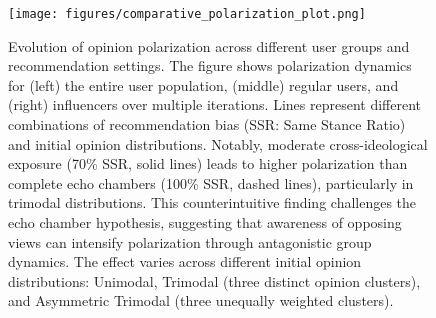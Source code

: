 \begin{figure}[htbp]
    \centering
    \texttt{[image: figures/comparative\_polarization\_plot.png]}
    \caption{Evolution of opinion polarization across different user groups and recommendation settings. The figure shows polarization dynamics for (left) the entire user population, (middle) regular users, and (right) influencers over multiple iterations. Lines represent different combinations of recommendation bias (SSR: Same Stance Ratio) and initial opinion distributions. Notably, moderate cross-ideological exposure (70\% SSR, solid lines) leads to higher polarization than complete echo chambers (100\% SSR, dashed lines), particularly in trimodal distributions. This counterintuitive finding challenges the echo chamber hypothesis, suggesting that awareness of opposing views can intensify polarization through antagonistic group dynamics. The effect varies across different initial opinion distributions: Unimodal, Trimodal (three distinct opinion clusters), and Asymmetric Trimodal (three unequally weighted clusters).}
    \label{fig:polarization-index}
\end{figure}
